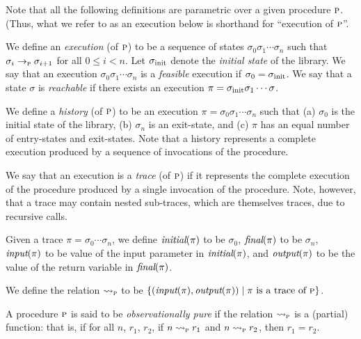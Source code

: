 Note that all the following definitions are parametric over a given procedure $\textsc{p}$.
(Thus, what we refer to as an execution below is shorthand for ``execution of $\textsc{p}$''.

We define an \emph{execution} (of $\textsc{p}$) to be a sequence of states $\sigma_0 \sigma_1 \cdots \sigma_n$ such that
$\sigma_i \rightarrow_{\textsc{p}} \sigma_{i+1}$ for all $0 \leq i < n$.
Let $\sigma_{\text{init}}$ denote the \emph{initial state} of the library.
We say that an execution $\sigma_0 \sigma_1 \cdots \sigma_n$ is a \emph{feasible} execution if $\sigma_0 = \sigma_{\text{init}}$.
We say that a state $\sigma$ is \emph{ reachable} if there exists an execution $\pi = \sigma_{\text{init}} \sigma_1 \cdots \sigma$.

We define a \emph{history} (of $\textsc{p}$) to be an execution $\pi = \sigma_0 \sigma_1 \cdots \sigma_n$ such that
(a) $\sigma_0$ is the initial state of the library,
(b) $\sigma_n$ is an exit-state, and
(c) $\pi$ has an equal number of entry-states and exit-states.
Note that a history represents a complete  execution produced by a
sequence of invocations of the procedure.

We say that an execution is a \emph{trace} (of $\textsc{p}$) if it represents the complete execution
of the procedure produced by a single invocation of the procedure.
Note, however, that a trace may contain nested sub-traces,
which are themselves traces, due to recursive calls.

Given a trace $\pi = \sigma_0 \cdots \sigma_n$, we define
$\textit{initial}(\pi)$ to be $\sigma_0$,
$\textit{final}(\pi)$ to be $\sigma_n$,
$\textit{input}(\pi)$ to be value of the input parameter in $\textit{initial}(\pi)$,
and $\textit{output}(\pi)$ to be the value of the return variable in $\textit{final}(\pi)$.

We define the relation $\rightsquigarrow_{\textsc{p}}$ to be $\{ (\textit{input}(\pi),\textit{output}(\pi)) \; | \; \pi \text{ is a trace of } \textsc{p} \}$.

\begin{definition}
A procedure $\textsc{p}$ is said to be \emph{observationally pure} if the relation $\rightsquigarrow_{\textsc{p}}$ is a (partial) function:
that is, if for all $n$, $r_1$, $r_2$, if  $n \rightsquigarrow_{\textsc{p}} r_1$ and $n \rightsquigarrow_{\textsc{p}} r_2$, then $r_1 = r_2$.
\end{definition}

